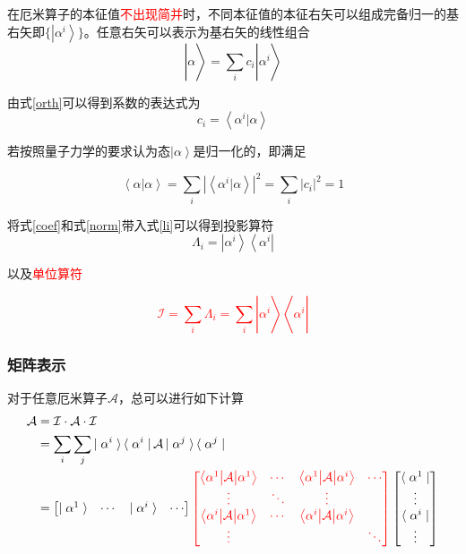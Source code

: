 \documentclass[UTF8,12pt]{article}
\providecommand\Ket[1]{\left|\right. #1 \left.\right\rangle}
\providecommand\Bra[1]{\left\langle\right. #1 \left.\right|}
\providecommand\Bracket[2]{\left\langle #1 \big| #2 \right\rangle}
\providecommand\BraCket[3]{\left\langle #1 \big| #2 \big| #3 \right\rangle}
\numberwithin{equation}{subsection}
\providecommand{\empR}[1]{\textcolor{red}{#1}}
\providecommand{\sumL}{\sum\limits}
\begin{document}
	在厄米算子的本征值\empR{不出现简并}时，不同本征值的本征右矢可以组成完备归一的基右矢即$\{\Ket{\alpha^i}\}$。任意右矢可以表示为基右矢的线性组合\begin{equation}
		\Ket{\alpha}=\sumL_ic_i\Ket{\alpha^i}
		\label{li}
	\end{equation}
	
	由式\ref{orth}可以得到系数的表达式为\begin{equation}
		c_i=\Bracket{\alpha^i}{\alpha}
		\label{coef}
	\end{equation}

	若按照量子力学的要求认为态$\Ket{\alpha}$是归一化的，即满足
	\begin{snugshade}
		\begin{equation}
			\Bracket{\alpha}{\alpha} = \sumL_i|\Bracket{\alpha^i}{\alpha}|^2=\sumL_i |c_i|^2=1
			\label{norm}
		\end{equation}
	\end{snugshade}
	
	将式\ref{coef}和式\ref{norm}带入式\ref{li}可以得到投影算符\begin{equation}
		\Lambda_i=\Ket{\alpha^i}\Bra{\alpha^i}
		\label{project}
	\end{equation}

	以及\empR{单位算符}
	\begin{snugshade}
		\empR{\begin{equation}
				\mathcal I=\sumL_i\Lambda_i=\sumL_i\Ket{\alpha^i}\Bra{\alpha^i}
		\end{equation}}
	\end{snugshade}
	\subsubsection{矩阵表示}
	对于任意厄米算子$\mathcal A$，总可以进行如下计算
	\begin{equation}
		\begin{aligned}
			\mathcal A &= \mathcal I\cdot \mathcal A\cdot \mathcal I\\
			  &= \sumL_i\sumL_j\Ket{\alpha^i}\Bra{\alpha^i}\mathcal A\Ket{\alpha^j}\Bra{\alpha^j}\\
			  &=\begin{bmatrix}
			  	\Ket{\alpha^1}&\cdots&\Ket{\alpha^i}&\cdots
			  \end{bmatrix}\empR{\begin{bmatrix}
			  \BraCket{\alpha^1}{\mathcal A}{\alpha^1}&\cdots&\BraCket{\alpha^1}{\mathcal A}{\alpha^i}&\cdots\\
			  \vdots&\ddots&\vdots&\\
			  \BraCket{\alpha^i}{\mathcal A}{\alpha^1}&\cdots&\BraCket{\alpha^i}{\mathcal A}{\alpha^i}\\
			  \vdots&&&\ddots
		  \end{bmatrix}}\begin{bmatrix}
	  		\Bra{\alpha^1}\\
  			\vdots\\
			\Bra{\alpha^i}\\
			\vdots
			\end{bmatrix}
		\end{aligned}
	\label{matrixO}
	\end{equation}
	
\end{document}
